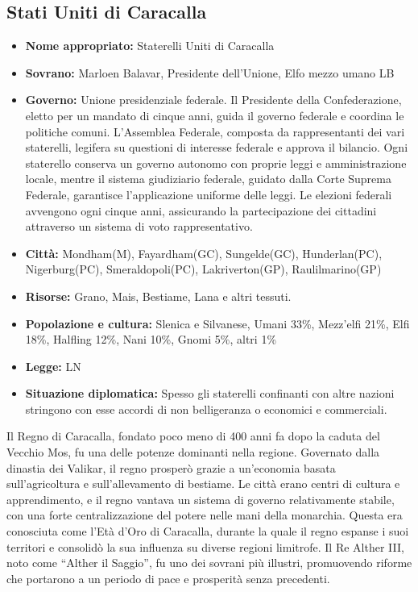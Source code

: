 \documentclass[10pt, a4paper]{report}
\begin{document}
\begin{multicols}{2}
\subsection*{Stati Uniti di Caracalla}
\begin{itemize}
	\item \textbf{Nome appropriato:} Staterelli Uniti di Caracalla
	\item \textbf{Sovrano:} Marloen Balavar, Presidente dell'Unione, Elfo mezzo umano LB
	\item \textbf{Governo:} Unione presidenziale federale. Il Presidente della Confederazione, eletto per un mandato di cinque anni, guida il governo federale e coordina le politiche comuni. L'Assemblea Federale, composta da rappresentanti dei vari staterelli, legifera su questioni di interesse federale e approva il bilancio. Ogni staterello conserva un governo autonomo con proprie leggi e amministrazione locale, mentre il sistema giudiziario federale, guidato dalla Corte Suprema Federale, garantisce l’applicazione uniforme delle leggi. Le elezioni federali avvengono ogni cinque anni, assicurando la partecipazione dei cittadini attraverso un sistema di voto rappresentativo.
	\item \textbf{Città:} Mondham(M), Fayardham(GC), Sungelde(GC), Hunderlan(PC), Nigerburg(PC), Smeraldopoli(PC), Lakriverton(GP), Raulilmarino(GP)
	\item \textbf{Risorse:} Grano, Mais, Bestiame, Lana e altri tessuti.
	\item \textbf{Popolazione e cultura:} Slenica e Silvanese, Umani 33\%, Mezz'elfi 21\%, Elfi 18\%, Halfling 12\%, Nani 10\%, Gnomi 5\%, altri 1\%
	\item \textbf{Legge:} LN
	\item \textbf{Situazione diplomatica:} Spesso gli staterelli confinanti con altre nazioni stringono con esse accordi di non belligeranza o economici e commerciali.
\end{itemize}
Il Regno di Caracalla, fondato poco meno di 400 anni fa dopo la caduta del Vecchio Mos, fu una delle potenze dominanti nella regione. Governato dalla dinastia dei Valikar, il regno prosperò grazie a un'economia basata sull'agricoltura e sull'allevamento di bestiame. Le città erano centri di cultura e apprendimento, e il regno vantava un sistema di governo relativamente stabile, con una forte centralizzazione del potere nelle mani della monarchia.
Questa era conosciuta come l'Età d'Oro di Caracalla, durante la quale il regno espanse i suoi territori e consolidò la sua influenza su diverse regioni limitrofe. Il Re Alther III, noto come “Alther il Saggio”, fu uno dei sovrani più illustri, promuovendo riforme che portarono a un periodo di pace e prosperità senza precedenti.

\end{multicols}
\end{document}
